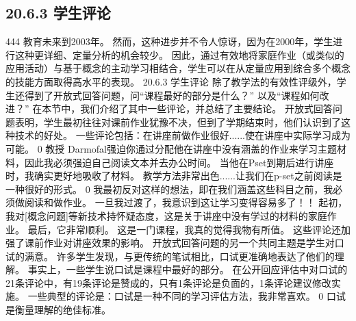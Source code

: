 \documentclass[UTF8,11pt,a4paper,openany,fontset=fandol]{ctexbook}
\begin{document}
\subsection{20.6.3 学生评论}
444 教育未来到2003年。 然而，这种进步并不令人惊讶，因为在2000年，学生进行这种更详细、定量分析的机会较少。 因此，通过有效地将家庭作业（或类似的应用活动）与基于概念的主动学习相结合，学生可以在从定量应用到综合多个概念的技能方面取得高水平的表现。 20.6.3 学生评论 除了教学法的有效性评级外，学生还得到了开放式回答问题，问“课程最好的部分是什么？” 以及“课程如何改进？” 在本节中，我们介绍了其中一些评论，并总结了主要结论。 开放式回答问题表明，学生最初往往对课前作业犹豫不决，但到了学期结束时，他们认识到了这种技术的好处。 一些评论包括：在讲座前做作业很好......使在讲座中实际学习成为可能。 0 教授 Darmofal强迫你通过分配他在讲座中没有涵盖的作业来学习主题材料，因此我必须强迫自己阅读文本并去办公时间。 当他在Pset到期后进行讲座时，我确实更好地吸收了材料。 教学方法非常出色......让我们在p-set之前阅读是一种很好的形式。 0 我最初反对这样的想法，即在我们涵盖这些科目之前，我必须做阅读和做作业。 一旦我过渡了，我意识到这让学习变得容易多了！！ 起初，我对[概念问题]等新技术持怀疑态度，这是关于讲座中没有学过的材料的家庭作业。 最后，它非常顺利。 这是一门课程，我真的觉得我物有所值。 这些评论还加强了课前作业对讲座效果的影响。 开放式回答问题的另一个共同主题是学生对口试的满意。 许多学生发现，与更传统的笔试相比，口试更准确地表达了他们的理解。 事实上，一些学生说口试是课程中最好的部分。 在公开回应评估中对口试的21条评论中，有19条评论是赞成的，只有1条评论是负面的，1条评论建议修改实施。 一些典型的评论是：口试是一种不同的学习评估方法，我非常喜欢。 0 口试是衡量理解的绝佳标准。
\end{document}
